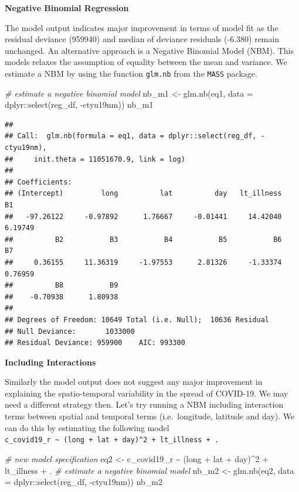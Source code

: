 \documentclass[
]{book}
\newenvironment{Shaded}{\begin{snugshade}}{\end{snugshade}}
\newcommand{\AttributeTok}[1]{\textcolor[rgb]{0.77,0.63,0.00}{#1}}
\newcommand{\CommentTok}[1]{\textcolor[rgb]{0.56,0.35,0.01}{\textit{#1}}}
\newcommand{\DecValTok}[1]{\textcolor[rgb]{0.00,0.00,0.81}{#1}}
\newcommand{\FunctionTok}[1]{\textcolor[rgb]{0.00,0.00,0.00}{#1}}
\newcommand{\NormalTok}[1]{#1}
\newcommand{\OtherTok}[1]{\textcolor[rgb]{0.56,0.35,0.01}{#1}}
\newcommand{\SpecialCharTok}[1]{\textcolor[rgb]{0.00,0.00,0.00}{#1}}
\begin{document}
\textbf{Negative Binomial Regression}

The model output indicates major improvement in terms of model fit as the residual deviance (959940) and median of deviance residuals (-6.380) remain unchanged. An alternative approach is a Negative Binomial Model (NBM). This models relaxes the assumption of equality between the mean and variance. We estimate a NBM by using the function \texttt{glm.nb} from the \texttt{MASS} package.

\begin{Shaded}
\begin{Highlighting}[]
\CommentTok{\# estimate a negative binomial model}
\NormalTok{nb\_m1 }\OtherTok{\textless{}{-}} \FunctionTok{glm.nb}\NormalTok{(eq1, }
       \AttributeTok{data =}\NormalTok{ dplyr}\SpecialCharTok{::}\FunctionTok{select}\NormalTok{(reg\_df, }\SpecialCharTok{{-}}\NormalTok{ctyu19nm))}
\NormalTok{nb\_m1}
\end{Highlighting}
\end{Shaded}

\begin{verbatim}
## 
## Call:  glm.nb(formula = eq1, data = dplyr::select(reg_df, -ctyu19nm), 
##     init.theta = 11051670.9, link = log)
## 
## Coefficients:
## (Intercept)         long          lat          day   lt_illness           B1  
##   -97.26122     -0.97892      1.76667     -0.01441     14.42040      6.19749  
##          B2           B3           B4           B5           B6           B7  
##     0.36155     11.36319     -1.97553      2.81326     -1.33374      0.76959  
##          B8           B9  
##    -0.70938      1.80938  
## 
## Degrees of Freedom: 10649 Total (i.e. Null);  10636 Residual
## Null Deviance:       1033000 
## Residual Deviance: 959900    AIC: 993300
\end{verbatim}

\textbf{Including Interactions}

Similarly the model output does not suggest any major improvement in explaining the spatio-temporal variability in the spread of COVID-19. We may need a different strategy then. Let's try running a NBM including interaction terms between spatial and temporal terms (i.e.~longitude, latitude and day). We can do this by estimating the following model \texttt{c\_covid19\_r\ \textasciitilde{}\ (long\ +\ lat\ +\ day)\^{}2\ +\ lt\_illness\ +\ .}

\begin{Shaded}
\begin{Highlighting}[]
\CommentTok{\# new model specification}
\NormalTok{eq2 }\OtherTok{\textless{}{-}}\NormalTok{ c\_covid19\_r }\SpecialCharTok{\textasciitilde{}}\NormalTok{ (long }\SpecialCharTok{+}\NormalTok{ lat }\SpecialCharTok{+}\NormalTok{ day)}\SpecialCharTok{\^{}}\DecValTok{2} \SpecialCharTok{+}\NormalTok{ lt\_illness }\SpecialCharTok{+}\NormalTok{ .}
\CommentTok{\# estimate a negative binomial model}
\NormalTok{nb\_m2 }\OtherTok{\textless{}{-}} \FunctionTok{glm.nb}\NormalTok{(eq2, }
       \AttributeTok{data =}\NormalTok{ dplyr}\SpecialCharTok{::}\FunctionTok{select}\NormalTok{(reg\_df, }\SpecialCharTok{{-}}\NormalTok{ctyu19nm))}
\NormalTok{nb\_m2}
\end{Highlighting}
\end{Shaded}
\end{document}
